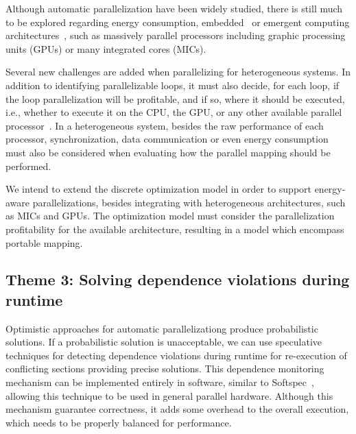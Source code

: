 \documentclass[a4paper,12pt]{article}
\begin{document}
Although automatic parallelization have been widely studied, there is still
much to be explored regarding energy consumption, embedded~\cite{cordes10} or
emergent computing
architectures~\cite{leung09,baskaran10,amini12,govindarajan13}, such as
massively parallel processors including graphic processing units (GPUs) or many
integrated cores (MICs).

Several new challenges are added when parallelizing for heterogeneous systems.
In addition to identifying parallelizable loops, it must also decide, for each
loop, if the loop parallelization will be profitable, and if so, where it
should be executed, i.e., whether to execute it on the CPU, the GPU, or any
other available parallel processor~\cite{tournavitis09,wang14a,leung09}.  In a
heterogeneous system, besides the raw performance of each processor,
synchronization, data communication or even energy consumption must also be
considered when evaluating how the parallel mapping should be performed.

We intend to extend the discrete optimization model in order to support
energy-aware parallelizations, besides integrating with heterogeneous
architectures, such as MICs and GPUs.  The optimization model must consider the
parallelization profitability for the available architecture,
resulting in a model which encompass portable mapping.

\subsection{Theme 3: Solving dependence violations during runtime}


Optimistic approaches for automatic parallelizationg produce probabilistic
solutions.  If a probabilistic solution is unacceptable, we can use speculative
techniques for detecting dependence violations during runtime for re-execution
of conflicting sections providing precise solutions.  This dependence
monitoring mechanism can be implemented entirely in software, similar to
Softspec~\cite{bruening98}, allowing this technique to be used in general
parallel hardware.  Although this mechanism guarantee correctness, it adds some
overhead to the overall execution, which needs to be properly balanced for
performance.
\end{document}
